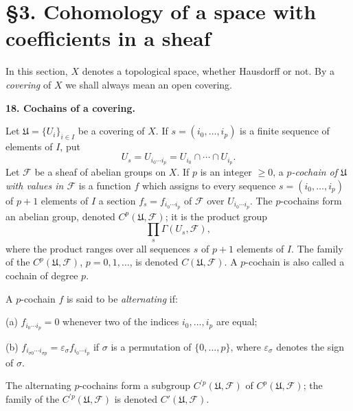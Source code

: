 
\label{fac:I:3}
\section*{\S3. Cohomology of a space with coefficients in a sheaf}

In this section, $X$ denotes a topological space, whether Hausdorff or not. By a \textit{covering} of $X$ we shall always mean an open covering.

\medskip
{}\label{fac:I:3:no:18}
\textbf{18. Cochains of a covering.}

Let $\mathfrak{U}=\{U_i\}_{i\in I}$ be a covering of $X$. If $s=(i_0,\ldots,i_p)$ is a finite sequence of elements of $I$, put
\[
U_s=U_{i_0\cdots i_p}=U_{i_0}\cap\cdots\cap U_{i_p}.
\]
Let $\mathcal{F}$ be a sheaf of abelian groups on $X$. If $p$ is an integer $\geq0$, a \textit{$p$-cochain of $\mathfrak{U}$ with values in $\mathcal{F}$} is a function $f$ which assigns to every sequence $s=(i_0,\ldots,i_p)$ of $p+1$ elements of $I$ a section $f_s=f_{i_0\cdots i_p}$ of $\mathcal{F}$ over $U_{i_0\cdots i_p}$. The $p$-cochains form an abelian group, denoted $C^p(\mathfrak{U},\mathcal{F})$; it is the product group
\[
\prod_s\Gamma(U_s,\mathcal{F}),
\]
where the product ranges over all sequences $s$ of $p+1$ elements of $I$. The family of the $C^p(\mathfrak{U},\mathcal{F})$, $p=0,1,\ldots$, is denoted $C(\mathfrak{U},\mathcal{F})$. A $p$-cochain is also called a cochain of degree $p$.

A $p$-cochain $f$ is said to be \textit{alternating} if:

\label{fac:I:3:no:18:alternating:item:a}(a) $f_{i_0\cdots i_p}=0$ whenever two of the indices $i_0,\ldots,i_p$ are equal;

\label{fac:I:3:no:18:alternating:item:b}(b) $f_{i_{\sigma0}\cdots i_{\sigma p}}=\varepsilon_\sigma f_{i_0\cdots i_p}$ if $\sigma$ is a permutation of $\{0,\ldots,p\}$, where $\varepsilon_\sigma$ denotes the sign of $\sigma$.

The alternating $p$-cochains form a subgroup $C^{\prime p}(\mathfrak{U},\mathcal{F})$ of $C^p(\mathfrak{U},\mathcal{F})$; the family of the $C^{\prime p}(\mathfrak{U},\mathcal{F})$ is denoted $C'(\mathfrak{U},\mathcal{F})$.
